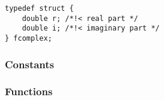 \begin{verbatim}
typedef struct {
    double r; /*!< real part */
    double i; /*!< imaginary part */
} fcomplex;
\end{verbatim}


\subsubsection{Constants}

\begin{describeconst}
\end{describeconst}

\subsubsection{Functions}
